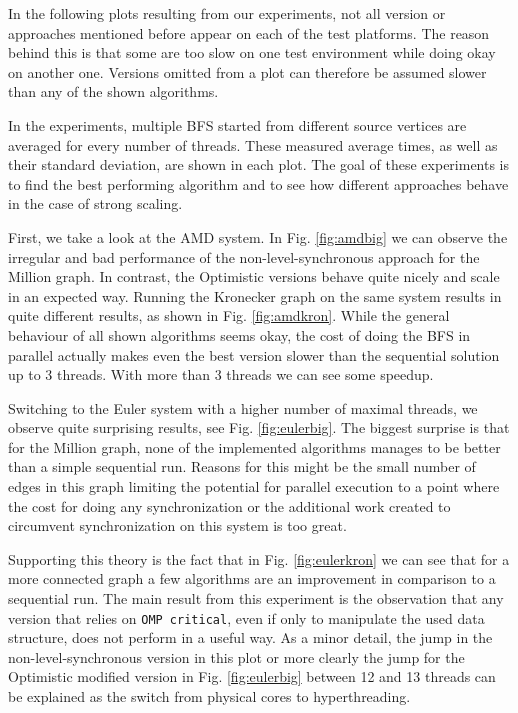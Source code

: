 \documentclass[letterpaper]{article}
\begin{document}


		In the following plots resulting from our experiments, not all version or approaches mentioned before appear on each of the test platforms. 
		The reason behind this is that some are too slow on one test environment while doing okay on another one.
		Versions omitted from a plot can therefore be assumed slower than any of the shown algorithms.
		
		In the experiments, multiple BFS started from different source vertices are averaged for every number of threads. 
		These measured average times, as well as their standard deviation, are shown in each plot.
		The goal of these experiments is to find the best performing algorithm and to see how different approaches behave in the case of strong scaling.

		First, we take a look at the AMD system.
		In Fig. \ref{fig:amdbig} we can observe the irregular and bad performance of the non-level-synchronous approach for the Million graph.
		In contrast, the Optimistic versions behave quite nicely and scale in an expected way.
		Running the Kronecker graph on the same system results in quite different results, as shown in Fig. \ref{fig:amdkron}.
		While the general behaviour of all shown algorithms seems okay, the cost of doing the BFS in parallel actually makes even the best version slower than the sequential solution up to 3 threads.
		With more than 3 threads we can see some speedup. 
		
		Switching to the Euler system with a higher number of maximal threads, we observe quite surprising results, see Fig. \ref{fig:eulerbig}.
		The biggest surprise is that for the Million graph, none of the implemented algorithms manages to be better than a simple sequential run.
		Reasons for this might be the small number of edges in this graph limiting the potential for parallel execution to a point where the cost for doing any synchronization or the additional work created to circumvent synchronization on this system is too great.

		Supporting this theory is the fact that in Fig. \ref{fig:eulerkron} we can see that for a more connected graph a few algorithms are an improvement in comparison to a sequential run.
		The main result from this experiment is the observation that any version that relies on \verb+OMP critical+, even if only to manipulate the used data structure, does not perform in a useful way.
		As a minor detail, the jump in the non-level-synchronous version in this plot or more clearly the jump for the Optimistic modified version in Fig. \ref{fig:eulerbig} between 12 and 13 threads can be explained as the switch from physical cores to hyperthreading.
\end{document}
